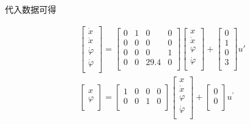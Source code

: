代入数据可得

\begin{equation}
\begin{aligned}
&\begin{bmatrix}
\dot x\\
\ddot x\\
\dot{\varphi}\\
\ddot{\varphi}\\
\end{bmatrix}
=
\begin{bmatrix}
0 & 1 & 0 & 0\\
0 & 0 & 0 & 0\\
0 & 0 & 0 & 1\\
0 & 0 & 29.4 & 0\\
\end{bmatrix}
\begin{bmatrix}
x\\
\dot x\\
\varphi\\
\dot{\varphi}\\
\end{bmatrix}
+
\begin{bmatrix}
0\\
1\\
0\\
3\\
\end{bmatrix}
u'\\
&\begin{bmatrix}
x\\
\varphi\\
\end{bmatrix}
=
\begin{bmatrix}
1 &0 &0 &0\\
0 &0 &1 &0\\
\end{bmatrix}
\begin{bmatrix}
x\\
\dot x\\
\varphi\\
\dot{\varphi}\\
\end{bmatrix}
+
\begin{bmatrix}
0\\
0\\
\end{bmatrix}
u^{'}\\
\end{aligned}
\end{equation}

